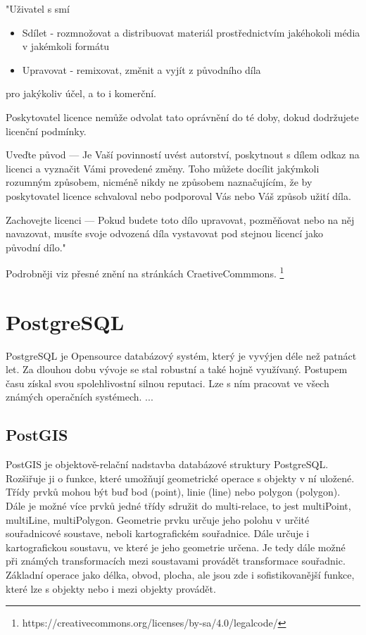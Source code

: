 "Uživatel s smí
\begin{itemize}
    \item   Sdílet - rozmnožovat a distribuovat materiál prostřednictvím jakéhokoli média v jakémkoli formátu
    \item   Upravovat - remixovat, změnit a vyjít z původního díla
\end{itemize}
pro jakýkoliv účel, a to i komerční.

Poskytovatel licence nemůže odvolat tato oprávnění do té doby, dokud dodržujete licenční podmínky.

Uveďte původ — Je Vaší povinností uvést autorství, poskytnout s dílem odkaz na licenci a vyznačit Vámi provedené změny. Toho můžete docílit jakýmkoli rozumným způsobem, nicméně nikdy ne způsobem naznačujícím, že by poskytovatel licence schvaloval nebo podporoval Vás nebo Váš způsob užití díla.

Zachovejte licenci — Pokud budete toto dílo upravovat, pozměňovat nebo na něj navazovat, musíte svoje odvozená díla vystavovat pod stejnou licencí jako původní dílo."

Podrobněji viz přesné znění na stránkách CraetiveCommmons.
\footnote{https://creativecommons.org/licenses/by-sa/4.0/legalcode/}


\section{PostgreSQL}
\label{PostgreSQL}
PostgreSQL je Opensource databázový systém, který je vyvýjen déle než patnáct
let. Za dlouhou dobu vývoje se stal robustní a také hojně využívaný.
Postupem času získal svou spolehlivostní silnou reputaci.
Lze s ním pracovat ve všech známých operačních systémech. 
...
\cite{PostgreSQL}

\subsection{PostGIS}
\label{PostGIS}
PostGIS je objektově-relační nadstavba databázové struktury PostgreSQL.
Rozšiřuje ji o funkce, které umožňují geometrické operace s objekty v ní uložené.
Třídy prvků mohou být buď bod (point), linie (line) nebo polygon (polygon).
Dále je možné více prvků jedné třídy sdružit do multi-relace, 
to jest  multiPoint, multiLine, multiPolygon.
Geometrie prvku určuje jeho polohu v určité souřadnicové soustave, neboli 
kartografickém souřadnice. Dále určuje i kartografickou soustavu, ve které je 
jeho geometrie určena. Je tedy dále možné při známých transformacích mezi
soustavami provádět transformace souřadnic. Základní operace jako délka, obvod,
plocha, ale jsou zde i sofistikovanější funkce, které lze s objekty nebo i mezi 
objekty provádět.

